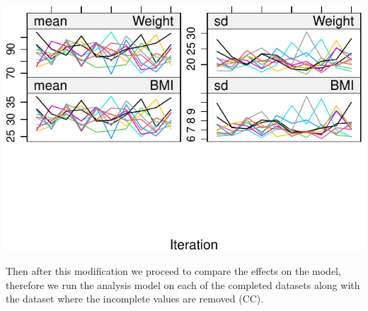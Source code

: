 \documentclass[
]{jss}
\begin{document}
\begin{CodeChunk}
\begin{center}\includegraphics{Imputation_of_Incomplete_Multilevel_Data_files/figure-latex/obsmnarp_plot-2} \end{center}

\end{CodeChunk}

Then after this modification we proceed to compare the effects on the
model, therefore we run the analysis model on each of the completed
datasets along with the dataset where the incomplete values are removed
(CC).
\end{document}
